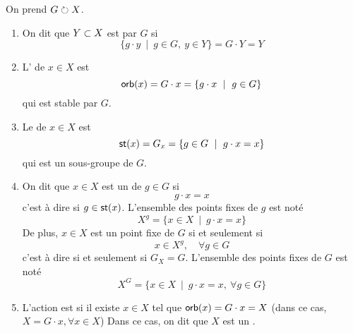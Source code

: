 \begin{definition}
    On prend \(G \circlearrowright X\). 
    \begin{enumerate}
        \item On dit que \(Y\subset X\) est  par \(G\) si 
        \begin{equation*}
            \{g\cdot y\ \mid\ g\in G,\ y\in Y\} = G\cdot Y = Y
        \end{equation*}

        \item L' de \(x\in X\) est
        \begin{equation*}
            \orb(x) = G\cdot x= \{g\cdot x\ \mid\ g\in G\}
        \end{equation*}
        qui est stable par \(G\).

        \item Le  de \(x\in X\) est
        \begin{equation*}
            \operatorname{\mathsf{st}}(x) = G_x = \{g\in G\ \mid\ g\cdot x = x\}
        \end{equation*}
        qui est un sous-groupe de \(G\).

        \item On dit que \(x\in X\) est un  de \(g\in G\) si
        \begin{equation*}
            g\cdot x = x
        \end{equation*}
        c'est à dire si \(g\in\operatorname{\mathsf{st}}(x)\).
        L'ensemble des points fixes de \(g\) est noté
        \begin{equation*}
            X^g = \{x\in X\ \mid\ g\cdot x = x\}
        \end{equation*}
        De plus, \(x\in X\) est un point fixe de \(G\) si et seulement si
        \begin{equation*}
            x\in X^g,\quad\forall g\in G
        \end{equation*}
        c'est à dire si et seulement si \(G_X = G\). L'ensemble des points fixes de \(G\) est
        noté
        \begin{equation*}
            X^G = \{x\in X\ \mid\ g\cdot x = x,\ \forall g\in G\}
        \end{equation*}

        \item L'action est  si il existe \(x \in X\)
        tel que \(\operatorname{\mathsf{orb}}(x) = G\cdot x = X\) (dans ce cas, \(X = G\cdot x,\forall x\in X\))
        Dans ce cas, on dit que \(X\) est un .

    \end{enumerate}
\end{definition}